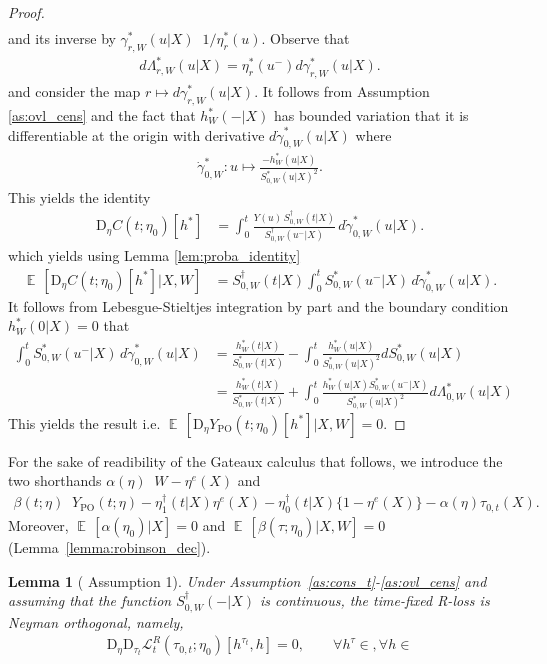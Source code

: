 \documentclass{article}
\newtheorem{lemma}[theorem]{Lemma}
\DeclareMathOperator*{\eqdef }{\,\stackrel{\text{def}}{=}\,}
\DeclareMathOperator{\EX}{\mathbb{E}\,}
\newcommand{\YPO}{Y_{\mathrm{PO}}}
\newcommand{\bD}{\mathrm{D}}
\begin{document}
\begin{proof}
\begin{align*}
\end{align*} 
and its inverse by $\gamma_{r,W}^*(u|X) \eqdef 1/\eta_r^*(u)$. Observe that 
\begin{align*}
d\Lambda_{r,W}^\ast(u|X) = \eta_r^*(u^-) d \gamma_{r,W}^*(u|X).
\end{align*}
and consider the map $r \mapsto d \gamma_{r,W}^*(u|X)$. 
It follows from Assumption \ref{as:ovl_cens} and the fact that $h^\ast_W(-|X)$ has bounded variation
that it is differentiable at the origin with derivative $d \dot \gamma_{0,W}^\ast(u|X)$ where
\begin{align*}
\dot{\gamma}_{0,W}^\ast : u \mapsto \frac{-h_W^*(u|X)}{S_{0,W}^\ast(u|X)^2}.
\end{align*}
This yields the identity
\begin{align*}
\bD_\eta  C(t;\eta_0) [h^*] &= \int_0^t \frac{Y(u) \, S^\dagger_{0,W}(t|X)}{S^\dagger_{0,W}(u^-|X)}\,d \dot \gamma_{0,W}^\ast(u|X).
\end{align*}
which yields using Lemma \ref{lem:proba_identity} 
\begin{align*}
\EX[\bD_\eta  C(t;\eta_0) [h^*] |X,W] &=  S^\dagger_{0,W}(t|X) \int_0^t\!S_{0,W}^*(u^-|X) \, d \dot \gamma_{0,W}^\ast(u|X).
\end{align*}
It follows from Lebesgue-Stieltjes integration by part and the boundary condition $h_W^*(0|X) = 0$ that
\begin{align*}
\int_0^t \!S_{0,W}^*(u^-|X) \,d \dot \gamma_{0,W}^\ast(u|X) &= 
\frac{h_W^*(t|X)}{S_{0,W}^\ast(t|X)} - \int_0^t \frac{h_W^*(u|X)}{S_{0,W}^\ast(u|X)^2} d S_{0,W}^*(u|X) \\
&= \frac{h_W^*(t|X)}{S_{0,W}^\ast(t|X)} + \int_0^t \frac{h_W^*(u|X)S_{0,W}^\ast(u^-|X)}{S_{0,W}^\ast(u|X)^2} d \Lambda_{0,W}^*(u|X) 
\end{align*}
This yields the result i.e. $\EX[\bD_\eta \YPO (t;\eta_0) [h^*] |X,W] = 0$.
\end{proof}
For the sake of readibility of the Gateaux calculus that follows, we introduce
the two shorthands $\alpha(\eta) \eqdef W - \eta^e(X)$ and 
\begin{align*}
\beta(t; \eta) \eqdef \YPO(t;\eta) 
- \eta_1^\dagger(t|X) \eta^e(X) - \eta_0^\dagger(t|X) \{1-\eta^e(X)\} 
- \alpha(\eta) \tau_{0,t}(X).
\end{align*}
Moreover, $\EX[\alpha(\eta_0)|X] = 0$ and $\EX[\beta(\tau; \eta_0)|X,W] = 0$ (Lemma~\ref{lemma:robinson_dec}).
\begin{lemma}[\citet{foster2023orthogonal} Assumption 1]
Under Assumption~\ref{as:cons_t}-\ref{as:ovl_cens} and assuming that the function $S_{0,W}^\dagger(-|X)$ 
is continuous, the time-fixed R-loss is Neyman orthogonal, namely,
\begin{align*}
 \bD_\eta \bD_{\tau_t} \mathcal{L}^R_t(\tau_{0,t}; \eta_0)[h^{\tau_t}, h] = 0, 
\qquad \forall h^\tau \in, \forall h \in %
\end{align*}
\end{lemma}
\end{document}
